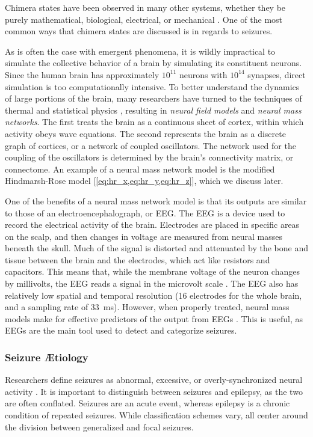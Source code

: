 Chimera states have been observed in many other systems, whether they be purely mathematical, biological, electrical, or mechanical \cite{Shanahan2010,Abrams2004,Andrzejak2016,Hizanidis2016,Kuramoto2002,Martens2013,Panaggio2015,Santos2015,Santos2017,Kruk2018,Xie2014}.
One of the most common ways that chimera states are discussed is in regards to seizures.

As is often the case with emergent phenomena, it is wildly impractical to simulate the collective behavior of a brain by simulating its constituent neurons.
Since the human brain has approximately $10^{11}$ neurons with $10^{14}$ synapses, direct simulation is too computationally intensive.
To better understand the dynamics of large portions of the brain, many researchers have turned to the techniques of thermal and statistical physics \cite{Breakspear2017},
resulting in \textit{neural field models} and \textit{neural mass networks}.
The first treats the brain as a continuous sheet of cortex, within which activity obeys wave equations.
The second represents the brain as a discrete graph of cortices, or a network of coupled oscillators.
The network used for the coupling of the oscillators is determined by the brain's connectivity matrix, or connectome.
An example of a neural mass network model is the modified Hindmarsh-Rose model [\cref{eq:hr_x,eq:hr_y,eq:hr_z}], which we discuss later.

One of the benefits of a neural mass network model is that its outputs are similar to those of an electroencephalograph, or EEG.
The EEG is a device used to record the electrical activity of the brain.
Electrodes are placed in specific areas on the scalp, and then changes in voltage are measured from neural masses beneath the skull.
Much of the signal is distorted and attenuated by the bone and tissue between the brain and the electrodes, which act like resistors and capacitors.
This means that, while the membrane voltage of the neuron changes by millivolts, the EEG reads a signal in the microvolt scale \cite{Kandel2013}.
The EEG also has relatively low spatial and temporal resolution (16 electrodes for the whole brain, and a sampling rate of \SI{33}{\ms}).
However, when properly treated, neural mass models make for effective predictors of the output from EEGs \cite{Taylor2012,Leistritz2007}.
This is useful, as EEGs are the main tool used to detect and categorize seizures.

\subsubsection{Seizure \AE tiology}
\label{sec:intro_seizures_aetiology}
Researchers define seizures as abnormal, excessive, or overly-synchronized neural activity \cite{Kandel2013,Baier2012}.
It is important to distinguish between seizures and epilepsy, as the two are often conflated.
Seizures are an acute event, whereas epilepsy is a chronic condition of repeated seizures.
While classification schemes vary, all center around the division between generalized and focal seizures.

